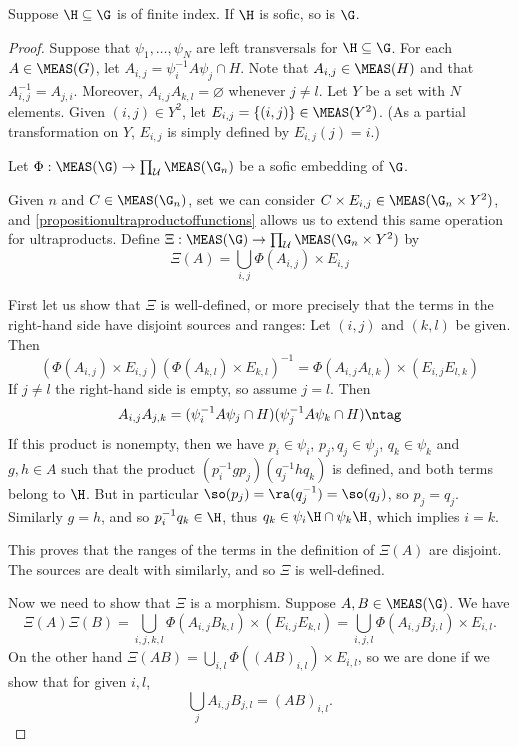 \begin{theorem}\label{theoremfiniteindexgroupoids}
Suppose $\H\subseteq\G$ is of finite index. If $\H$ is sofic, so is $\G$.
\end{theorem}
\begin{proof}
Suppose that $\psi_1,\ldots,\psi_N$ are left transversals for $\H\subseteq\G$. For each $A\in\MEAS(G)$, let $A_{i,j}=\psi_i^{-1}A\psi_j\cap H$. Note that $A_{i,j}\in\MEAS(H)$ and that $A_{i,j}^{-1}=A_{j,i}$. Moreover, $A_{i,j}A_{k,l}=\varnothing$ whenever $j\neq l$. Let $Y$ be a set with $N$ elements. Given $(i,j)\in Y^2$, let $E_{i,j}=\left\{(i,j)\right\}\in\MEAS(Y^2)$. (As a partial transformation on $Y$, $E_{i,j}$ is simply defined by $E_{i,j}(j)=i$.)

Let $\Phi:\MEAS(\G)\to\prod_\mathcal{U}\MEAS(\G_n)$ be a sofic embedding of $\G$.

Given $n$ and $C\in\MEAS(\G_n)$, set we can consider $C\times E_{i,j}\in\MEAS(\G_n\times Y^2)$, and \ref{propositionultraproductoffunctions} allows us to extend this same operation for ultraproducts. Define $\Xi:\MEAS(\G)\to\prod_{\mathcal{U}}\MEAS(\G_n\times Y^2)$ by
\[\Xi(A)=\bigcup_{i,j}\Phi(A_{i,j})\times E_{i,j}\]

First let us show that $\Xi$ is well-defined, or more precisely that the terms in the right-hand side have disjoint sources and ranges: Let $(i,j)$ and $(k,l)$ be given. Then
\[\left(\Phi(A_{i,j})\times E_{i,j}\right)\left(\Phi(A_{k,l})\times E_{k,l}\right)^{-1}=\Phi(A_{i,j}A_{l,k})\times(E_{i,j}E_{l,k})\]
If $j\neq l$ the right-hand side is empty, so assume $j=l$. Then
\[A_{i,j}A_{j,k}=(\psi_i^{-1}A\psi_j\cap H)(\psi_j^{-1}A\psi_k\cap H)\ntag\label{equationduringsoficfiniteindex}\]
If this product is nonempty, then we have $p_i\in\psi_i$, $p_j,q_j\in\psi_j$, $q_k\in\psi_k$ and $g,h\in A$ such that the product $(p_i^{-1}gp_j)(q_j^{-1}hq_k)$ is defined, and both terms belong to $\H$. But in particular $\so(p_j)=\ra(q_j^{-1})=\so(q_j)$, so $p_j=q_j$. Similarly $g=h$, and so $p_i^{-1}q_k\in\H$, thus $q_k\in\psi_i\H\cap\psi_k\H$, which implies $i=k$.

This proves that the ranges of the terms in the definition of $\Xi(A)$ are disjoint. The sources are dealt with similarly, and so $\Xi$ is well-defined.

Now we need to show that $\Xi$ is a morphism. Suppose $A,B\in\MEAS(\G)$. We have
\[\Xi(A)\Xi(B)=\bigcup_{i,j,k,l}\Phi(A_{i,j}B_{k,l})\times (E_{i,j}E_{k,l})=\bigcup_{i,j,l}\Phi(A_{i,j}B_{j,l})\times E_{i,l}.\]
On the other hand $\Xi(AB)=\bigcup_{i,l}\Phi((AB)_{i,l})\times E_{i,l}$, so we are done if we show that for given $i,l$,
\[\bigcup_jA_{i,j}B_{j,l}=(AB)_{i,l}.\]


\end{proof}
